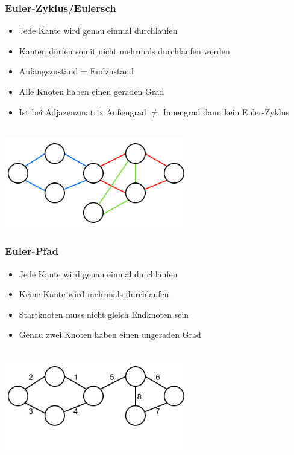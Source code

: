 \begin{minipage}{0.5\textwidth}
\subsubsection*{Euler-Zyklus/Eulersch}
\begin{itemize}[leftmargin=*]
\item Jede Kante wird genau einmal durchlaufen
\item Kanten dürfen somit nicht mehrmals durchlaufen werden
\item Anfangszustand = Endzustand
\item Alle Knoten haben einen geraden Grad
\item Ist bei Adjazenzmatrix Außengrad $\not =$ Innengrad dann kein Euler-Zyklus
\end{itemize}\
\\
\includegraphics[width=0.6\textwidth]{graphics/graph_euler_zyklus.png}
\end{minipage}
\hfill
\begin{minipage}{0.5\textwidth}
\subsubsection*{Euler-Pfad}
\begin{itemize}[leftmargin=*]
\item Jede Kante wird genau einmal durchlaufen
\item Keine Kante wird mehrmals durchlaufen
\item Startknoten muss nicht gleich Endknoten sein
\item Genau zwei Knoten haben einen ungeraden Grad
\end{itemize}\
\\
\includegraphics[width=0.6\textwidth]{graphics/graph_euler_pfad.png}\end{minipage}

